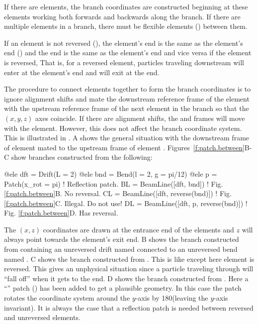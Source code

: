 If there are  elements, the branch coordinates are constructed beginning at these
elements working both forwards and backwards along the branch. 
If there are multiple  elements in a branch, there must be flexible 
elements () between them.

If an element is not reversed (),
the element's  end is the same as the element's  end 
() and the
 end is the same as the element's  end and
vice versa if the element is reversed, 
That is, for a reversed element, particles 
traveling downstream will
enter at the element's  end and will exit at the  end.

The procedure to connect elements together to form the branch coordinates is to ignore 
alignment shifts and mate the
downstream reference frame of the element with the upstream reference frame of the next element in
the branch so that the $(x,y,z)$ axes coincide.
If there are alignment shifts, the  and  frames will move with the element. 
However, this does not affect the branch
coordinate system.
This is illustrated in . A shows the general situation
with the downstream frame of element  mated to the upstream frame of element .
Figures~\ref{f:patch.between}B-C show branches constructed from the following:
\begin{example}
  @ele dft = Drift(L = 2)
  @ele bnd = Bend(l = 2, g = pi/12)
  @ele p = Patch(x_rot = pi)             ! Reflection patch.
  BL = BeamLine([dft, bnd])              ! Fig. \ref{f:patch.between}B. No reversal.
  CL = BeamLine([dft, reverse(bnd)])     ! Fig. \ref{f:patch.between}C. Illegal. Do not use!
  DL = BeamLine([dft, p, reverse(bnd)])  ! Fig. \ref{f:patch.between}D. Has reversal.
\end{example}
The $(x,z)$ coordinates are drawn at the entrance end of the elements and $z$ will always point
towards the element's exit end.  B shows the branch constructed from
 containing an unreversed drift named  connected to an unreversed bend named
. C shows the branch constructed from . This is like
 except here element  is reversed. This gives an unphysical situation since a
particle traveling through  will ``fall off'' when it gets to the end.
D shows the branch constructed from . Here a ``''
patch  () has been added to get a plausible geometry. 
In this case the patch rotates the
coordinate system around the $y$-axis by 180\Deg (leaving the $y$-axis invariant). 
It is always the case that a reflection patch is needed between reversed and unreversed elements.

